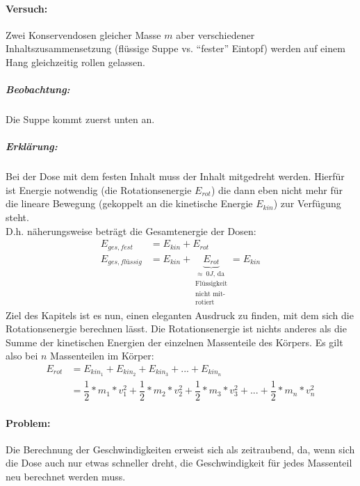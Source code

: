 	\paragraph{Versuch:}
	Zwei Konservendosen gleicher Masse $ m $ aber verschiedener Inhaltszusammensetzung (flüssige Suppe vs. ``fester'' Eintopf) werden auf einem Hang gleichzeitig rollen gelassen.
	\subparagraph{Beobachtung:}
	Die Suppe kommt zuerst unten an.
	\subparagraph{Erklärung:}
	Bei der Dose mit dem festen Inhalt muss der Inhalt mitgedreht werden. Hierfür ist Energie notwendig (die Rotationsenergie $ E_{rot} $) die dann eben nicht mehr für die lineare Bewegung (gekoppelt an die kinetische Energie $ E_{kin} $) zur Verfügung steht.\\
	D.h. näherungsweise beträgt die Gesamtenergie der Dosen:
	\begin{align}
		E_{ges, fest} &= E_{kin}+E_{rot}\\
		E_{ges, fl\textit{\"u}ssig} &= E_{kin}+\underbrace{E_{rot}}_{\substack{\approx \ 0J\text{, da}\\\text{Flüssigkeit} \\ \text{nicht mit-}\\\text{rotiert}}} = E_{kin}
	\end{align}
	Ziel des Kapitels ist es nun, einen eleganten Ausdruck zu finden, mit dem sich die Rotationsenergie berechnen lässt.
	Die Rotationsenergie ist nichts anderes als die Summe der kinetischen Energien der einzelnen Massenteile des Körpers. Es gilt also bei $ n $ Massenteilen im Körper:
	\begin{align}
		E_{rot} &= E_{kin_1}+E_{kin_2}+E_{kin_3}+...+E_{kin_n}\\
		&= \dfrac{1}{2}*m_1*v_1^2+\dfrac{1}{2}*m_2*v_2^2+\dfrac{1}{2}*m_3*v_3^2+...+\dfrac{1}{2}*m_n*v_n^2
	\end{align}
	\paragraph{Problem:}
	Die Berechnung der Geschwindigkeiten erweist sich als zeitraubend, da, wenn sich die Dose auch nur etwas schneller dreht, die Geschwindigkeit für jedes Massenteil neu berechnet werden muss.
